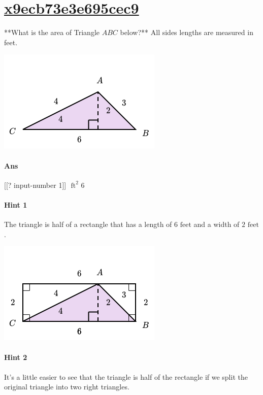 \documentclass[twocolumn,10pt]{article}
\def\shrinkfactor{0.55}
\begin{document}
\section{\href{https://www.khanacademy.org/devadmin/content/items/x9ecb73e3e695cec9}{x9ecb73e3e695cec9}}

\noindent
**What is the area of Triangle $ABC$ below?**  
All sides lengths are measured in feet.  


\includegraphics[scale=\shrinkfactor]{figures/1d918c5a96ec2027125b880b5f332b4564134beb.png}

\paragraph{Ans} [[? input-number 1]] $\text { ft}^2$  6

\paragraph{Hint 1}The triangle is half of a rectangle that has a length of $6\text{ feet}$ and a width of $2\text{ feet}$.  



\includegraphics[scale=\shrinkfactor]{figures/f92f863cca1091392224b0a6c95d7afcab9eb2bd.png}

\paragraph{Hint 2}It's a little easier to see that the triangle is half of the rectangle if we split the original triangle into two right triangles.
\end{document}
